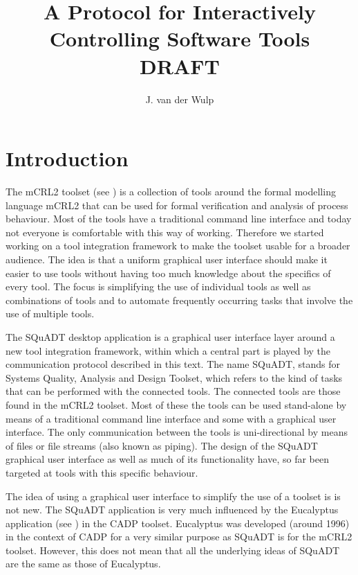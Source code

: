 \documentclass{article}
\title{A Protocol for Interactively Controlling Software Tools\\DRAFT}
\author{J. van der Wulp}
\newcommand{\squadt}{SQuADT\xspace}
\begin{document}
\maketitle
\thispagestyle{empty}

 \section{Introduction}

  The mCRL2 toolset (see \cite{groote_et_al:DSP:2007:862}) is a collection of
  tools around the formal modelling language mCRL2 that can be used for formal
  verification and analysis of process behaviour.  Most of the tools have a
  traditional command line interface and today not everyone is comfortable with
  this way of working.  Therefore we started working on a tool integration
  framework to make the toolset usable for a broader audience. The idea is that
  a uniform graphical user interface should make it easier to use tools without
  having too much knowledge about the specifics of every tool.  The focus is
  simplifying the use of individual tools as well as combinations of tools and
  to automate frequently occurring tasks that involve the use of multiple
  tools.
  
  The \squadt desktop application is a graphical user interface layer around a
  new tool integration framework, within which a central part is played by the
  communication protocol described in this text.  The name \squadt, stands for
  Systems Quality, Analysis and Design Toolset, which refers to the kind of
  tasks that can be performed with the connected tools. The connected tools are
  those found in the mCRL2 toolset. Most of these the tools can be used
  stand-alone by means of a traditional command line interface and some with a
  graphical user interface.  The only communication between the tools is
  uni-directional by means of files or file streams (also known as piping). The
  design of the \squadt graphical user interface as well as much of its
  functionality have, so far been targeted at tools with this specific
  behaviour.
  
  The idea of using a graphical user interface to simplify the use of a toolset
  is is not new. The \squadt application is very much influenced by the
  Eucalyptus application (see \cite{CADP}) in the CADP toolset. Eucalyptus was
  developed (around 1996) in the context of CADP for a very similar purpose as
  \squadt is for the mCRL2 toolset. However, this does not mean that all the
  underlying ideas of \squadt are the same as those of Eucalyptus.
  
\end{document}
